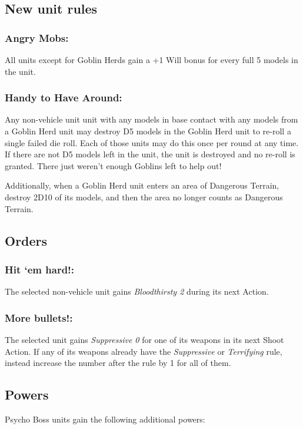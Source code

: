\subsection*{New unit rules}

\subsubsection*{Angry Mobs:} All units except for Goblin Herds gain a +1 Will bonus for every full 5 models in the unit.

\subsubsection*{Handy to Have Around:} Any non-vehicle unit unit with any models in base contact with any models from a Goblin Herd unit may destroy D5 models in the Goblin Herd unit to re-roll a single failed die roll. Each of those units may do this once per round at any time. If there are not D5 models left in the unit, the unit is destroyed and no re-roll is granted. There just weren't enough Goblins left to help out!

Additionally, when a Goblin Herd unit enters an area of Dangerous Terrain, destroy 2D10 of its models, and then the area no longer counts as Dangerous Terrain.

\subsection*{Orders}
\subsubsection*{Hit ‘em hard!:} The selected non-vehicle unit gains \textit{Bloodthirsty 2} during its next Action.

\subsubsection*{More bullets!:} The selected unit gains \textit{Suppressive 0} for one of its weapons in its next Shoot Action. If any of its weapons already have the \textit{Suppressive} or \textit{Terrifying} rule, instead increase the number after the rule by 1 for all of them.

\subsection*{Powers}

Psycho Boss units gain the following additional powers:

